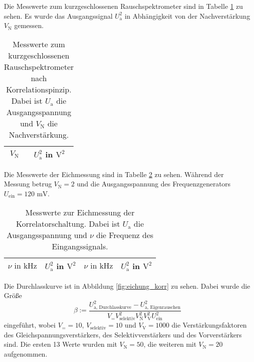 		Die Messwerte zum kurzgeschlossenen Rauschspektrometer sind 
		in Tabelle \ref{tab:eichung_eigenrauschen_korr} zu sehen. 
		Es wurde das Ausgangssignal $U^2_\text{a}$ in Abhängigkeit von 
		der Nachverstärkung $V_\text{N}$ gemessen.
		
		\begin{table}[h]
		\centering
			\begin{tabular}{cc}
				\toprule \midrule
				$V_\text{N}$ & $U^2_\text{a}$ in $\text{V}^2$
				\\
				\midrule
				
				\midrule \bottomrule
			\end{tabular}
			\caption{Messwerte zum kurzgeschlossenen  
			Rauschspektrometer nach Korrelationspinzip. Dabei ist $U_\text{a}$ die 
			Ausgangsspannung und $V_\text{N}$ die Nachverstärkung.}
			\label{tab:eichung_eigenrauschen_korr}
		\end{table}
		
		Die Messwerte der Eichmessung sind in Tabelle 
		\ref{tab:eichung_korr} zu sehen. Während der Messung 
		betrug $V_\text{N}=2$ und die Ausgangsspannung des 
		Frequenzgenerators $U_\text{ein} = 120 \text{ mV}$.
		
		\begin{table}[h]
		\centering
			\begin{tabular}{cccc}
				\toprule \midrule
				$\nu \text{ in} \text{ kHz}$ & $U^2_\text{a}$ in $\text{V}^2$ &
				$\nu \text{ in} \text{ kHz}$ & $U^2_\text{a}$ in $\text{V}^2$ 
				\\
				\midrule
				
				\midrule \bottomrule
			\end{tabular}
			\caption{Messwerte zur Eichmessung der Korrelatorschaltung. Dabei ist $U_\text{a}$ 
			die 
			Ausgangsspannung und $\nu$ die Frequenz des 
			Eingangssignals. }
			\label{tab:eichung_korr}
		\end{table}
		
		Die Durchlasskurve ist in Abbildung \ref{fig:eichung_korr} zu sehen. Dabei wurde die Größe  
		\begin{equation}
		\beta := \frac{U^2_\text{a, Durchlasskurve}-U_\text{a, Eigenrauschen}^2}
		{V_= V_\text{selektiv}^2 V_\text{N}^2 V_\text{V}^2  U^2_\text{ein}}
		\end{equation}
		eingeführt, wobei $V_= =10$, $V_\text{selektiv}=10$ und $V_\text{V}=1000$
		die Verstärkungsfaktoren des Gleichspannungsverstärkers, des Selektivverstärkers und des 
		Vorverstärkers sind. Die ersten 13 Werte wurden mit $V_\text{N}=50$, die weiteren 
		mit $V_\text{N}=20$ aufgenommen.
				
